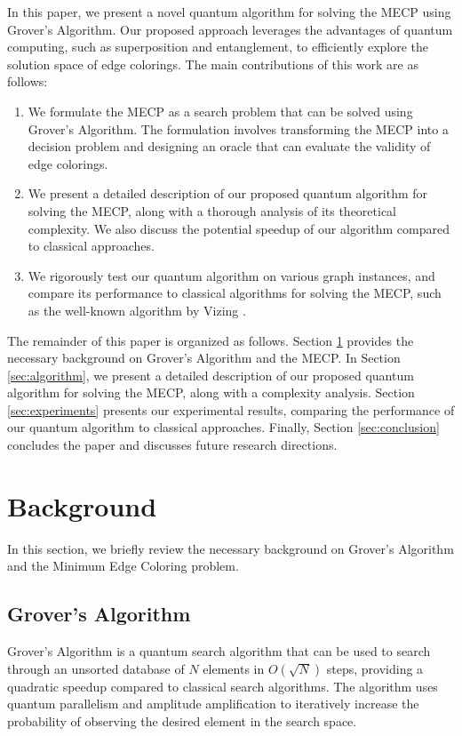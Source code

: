 In this paper, we present a novel quantum algorithm for solving the MECP using Grover's Algorithm. Our proposed approach leverages the advantages of quantum computing, such as superposition and entanglement, to efficiently explore the solution space of edge colorings. The main contributions of this work are as follows:

\begin{enumerate}
    \item We formulate the MECP as a search problem that can be solved using Grover's Algorithm. The formulation involves transforming the MECP into a decision problem and designing an oracle that can evaluate the validity of edge colorings.
    \item We present a detailed description of our proposed quantum algorithm for solving the MECP, along with a thorough analysis of its theoretical complexity. We also discuss the potential speedup of our algorithm compared to classical approaches.
    \item We rigorously test our quantum algorithm on various graph instances, and compare its performance to classical algorithms for solving the MECP, such as the well-known algorithm by Vizing \cite{vizing1965chromatic}.
\end{enumerate}

The remainder of this paper is organized as follows. Section \ref{sec:background} provides the necessary background on Grover's Algorithm and the MECP. In Section \ref{sec:algorithm}, we present a detailed description of our proposed quantum algorithm for solving the MECP, along with a complexity analysis. Section \ref{sec:experiments} presents our experimental results, comparing the performance of our quantum algorithm to classical approaches. Finally, Section \ref{sec:conclusion} concludes the paper and discusses future research directions.

\section{Background}\label{sec:background}

In this section, we briefly review the necessary background on Grover's Algorithm and the Minimum Edge Coloring problem.

\subsection{Grover's Algorithm}

Grover's Algorithm \cite{grover1996fast} is a quantum search algorithm that can be used to search through an unsorted database of $N$ elements in $O(\sqrt{N})$ steps, providing a quadratic speedup compared to classical search algorithms. The algorithm uses quantum parallelism and amplitude amplification to iteratively increase the probability of observing the desired element in the search space.

